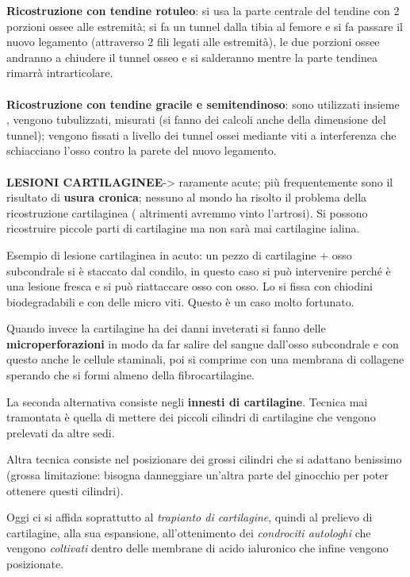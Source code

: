 \textbf{Ricostruzione con tendine rotuleo}: si usa la parte centrale del tendine con 2 porzioni ossee alle estremità; si fa un tunnel dalla tibia al femore e si fa passare il nuovo legamento (attraverso 2 fili legati alle estremità), le due porzioni ossee andranno a chiudere il tunnel osseo e si salderanno mentre la parte tendinea rimarrà intrarticolare.
\\\\
\textbf{Ricostruzione con tendine gracile e semitendinoso}: sono utilizzati insieme , vengono tubulizzati, misurati (si fanno dei calcoli anche della dimensione del tunnel); vengono fissati a livello dei tunnel ossei mediante viti a interferenza che schiacciano l'osso contro la parete del nuovo legamento.
\\\\
\textbf{LESIONI CARTILAGINEE}-> raramente acute; più frequentemente sono il risultato di \textbf{usura cronica}; nessuno al mondo ha risolto il problema della ricostruzione cartilaginea ( altrimenti avremmo vinto l'artrosi). Si possono ricostruire piccole parti di cartilagine ma non sarà mai cartilagine ialina.

Esempio di lesione cartilaginea in acuto: un pezzo di cartilagine + osso subcondrale si è staccato dal condilo, in questo caso si può intervenire perché è una lesione fresca e si può riattaccare osso con osso. Lo si fissa con chiodini biodegradabili e con delle micro viti. Questo è un caso molto fortunato.

Quando invece la cartilagine ha dei danni inveterati si fanno delle \textbf{microperforazioni} in modo da far salire del sangue dall'osso subcondrale e con questo anche le cellule staminali, poi si comprime con una membrana di collagene sperando che si formi almeno della fibrocartilagine.

La seconda alternativa consiste negli \textbf{innesti di cartilagine}.
Tecnica mai tramontata è quella di mettere dei piccoli cilindri di cartilagine che vengono prelevati da altre sedi.

Altra tecnica consiste nel posizionare dei grossi cilindri che si adattano benissimo (grossa limitazione: bisogna danneggiare un'altra parte del ginocchio per poter ottenere questi cilindri).

Oggi ci si affida soprattutto al \emph{trapianto di cartilagine}, quindi al prelievo di cartilagine, alla sua espansione, all'ottenimento dei \emph{condrociti autologhi} che vengono \emph{coltivati} dentro delle membrane di acido ialuronico che infine vengono posizionate.

